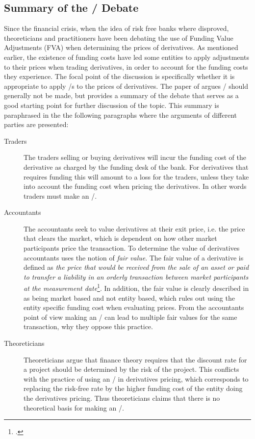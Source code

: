 \documentclass[../../../main.tex]{subfiles}
\begin{document}
    \subsection{Summary of the \FVA/ Debate}
        Since the financial crisis, when the idea of risk free banks where disproved,
        theoreticians and practitioners have been debating the use of Funding Value Adjustments (FVA)
        when determining the prices of derivatives.
        As mentioned earlier, the existence of funding costs have led some entities 
        to apply adjustments to their prices when trading derivatives, 
        in order to account for the funding costs they experience.
        The focal point of the discussion is specifically 
        whether it is appropriate to apply \FVA/s to the prices of derivatives.
        The paper of \cite{HullWhiteFVA} argues \FVA/ should generally not be made,
        but provides a summary of the debate that serves as a good starting point for further discussion of the topic.
        This summary is paraphrased in the the following paragraphs where the arguments of different parties are presented:

        \begin{description}
            \item[Traders] The traders selling or buying derivatives will incur the funding cost of the derivative as charged by the funding desk of the bank.
            For derivatives that requires funding this will amount to a loss for the traders,
            unless they take into account the funding cost when pricing the derivatives.
            In other words traders must make an \FVA/. 
            \item[Accountants] The accountants seek to value derivatives at their exit price, i.e. the price that clears the market,
            which is dependent on how other market participants price the transaction.
            To determine the value of derivatives accountants uses the notion of \textit{fair value}.
            The fair value of a derivative is defined as \textit{the price that would be received from the sale of an asset or paid to transfer a liability in an orderly transaction between market participants at the measurement date}\footcite{IFRS13}.
            In addition, the fair value is clearly described in \cite{IFRS13} as being market based and not entity based,
            which rules out using the entity specific funding cost when evaluating prices.
            From the accountants point of view making an \FVA/ can lead to multiple fair values for the same transaction,
            why they oppose this practice.
            \item[Theoreticians] Theoreticians argue that finance theory requires that the discount rate for a project should be determined by the risk of the project.
            This conflicts with the practice of using an \FVA/ in derivatives pricing,
            which corresponds to replacing the risk-free rate by the higher funding cost of the entity doing the derivatives pricing.
            Thus theoreticians claims that there is no theoretical basis for making an \FVA/.
        \end{description}
\end{document}
